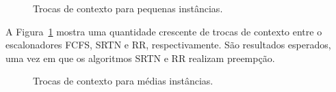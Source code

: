 \documentclass[12pt]{article}
\begin{document}
\begin{figure}
	\centering
	\hfill
	\caption{Trocas de contexto para pequenas instâncias.}
	\label{fig:tcS}
\end{figure}

A Figura~\ref{fig:tcS} mostra uma quantidade crescente de trocas de contexto entre o escalonadores FCFS, SRTN e RR, respectivamente. São resultados esperados, uma vez em que os algoritmos SRTN e RR realizam preempção.

\begin{figure}
	\centering
	\hfill
	\caption{Trocas de contexto para médias instâncias.}
	\label{fig:tcM}
\end{figure}
\end{document}
